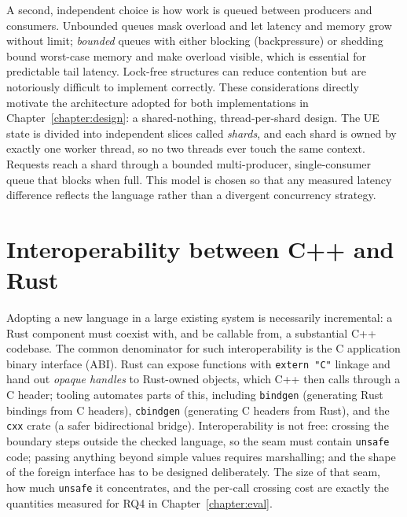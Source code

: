 \documentclass[english,twoside,openright,a4paper,censored,csm,software-track-2020]{HYthesisML}
\begin{document}
A second, independent choice is how work is queued between producers and consumers. Unbounded
queues mask overload and let latency and memory grow without limit; \emph{bounded} queues with
either blocking (backpressure) or shedding bound worst-case memory and make overload visible,
which is essential for predictable tail latency. Lock-free structures can reduce contention
but are notoriously difficult to implement correctly. These considerations directly motivate
the architecture adopted for both implementations in Chapter~\ref{chapter:design}: a
shared-nothing, thread-per-shard design. The UE state is divided into independent slices called
\emph{shards}, and each shard is owned by exactly one worker thread, so no two threads ever
touch the same context. Requests reach a shard through a bounded multi-producer,
single-consumer queue that blocks when full. This model is chosen so that any measured latency
difference reflects the language rather than a divergent concurrency strategy.

\section{Interoperability between C++ and Rust}
Adopting a new language in a large existing system is necessarily incremental: a Rust
component must coexist with, and be callable from, a substantial C++ codebase. The common
denominator for such interoperability is the C application binary interface (ABI). Rust can
expose functions with \texttt{extern "C"} linkage and hand out \emph{opaque handles} to
Rust-owned objects, which C++ then calls through a C header; tooling automates parts of this,
including \texttt{bindgen} (generating Rust bindings from C headers), \texttt{cbindgen}
(generating C headers from Rust), and the \texttt{cxx} crate (a safer bidirectional bridge).
Interoperability is not free: crossing the boundary steps outside the checked language, so the
seam must contain \texttt{unsafe} code; passing anything beyond simple values requires
marshalling; and the shape of the foreign interface has to be designed deliberately. The size
of that seam, how much \texttt{unsafe} it concentrates, and the per-call crossing cost are
exactly the quantities measured for RQ4 in Chapter~\ref{chapter:eval}.
\end{document}
